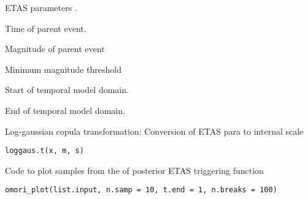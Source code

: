 \documentclass[letterpaper]{book}
\begin{document}
%
\begin{Arguments}
\begin{ldescription}
\item[\code{theta}] ETAS parameters .

\item[\code{ti}] Time of parent event.

\item[\code{mi}] Magnitude of parent event

\item[\code{M0}] Minimum magnitude threshold

\item[\code{T1}] Start of temporal model domain.

\item[\code{T2}] End of temporal model domain.
\end{ldescription}
\end{Arguments}
%
\begin{Description}\relax
Log-gaussian copula transformation: Conversion of ETAS para to internal scale
\end{Description}
%
\begin{Usage}
\begin{verbatim}
loggaus.t(x, m, s)
\end{verbatim}
\end{Usage}
%
\begin{Arguments}
\begin{ldescription}
\item[\code{s}] 
\end{ldescription}
\end{Arguments}
%
\begin{Description}\relax
Code to plot samples from the of posterior ETAS triggering function
\end{Description}
%
\begin{Usage}
\begin{verbatim}
omori_plot(list.input, n.samp = 10, t.end = 1, n.breaks = 100)
\end{verbatim}
\end{Usage}
%
\begin{Arguments}
\begin{ldescription}
\item[\code{list.input}] 

\item[\code{n.breaks}] 
\end{ldescription}
\end{Arguments}
\end{document}
